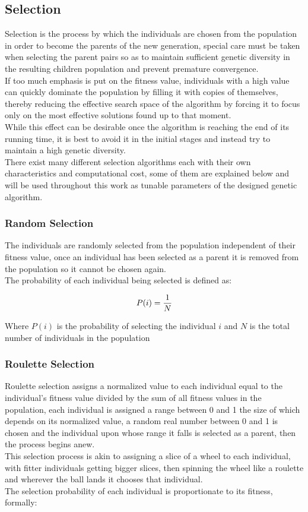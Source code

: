 \subsection{Selection}
Selection is the process by which the individuals are chosen from the population in order to become the parents of the new generation, special care must be taken when selecting the parent pairs so as to maintain sufficient genetic diversity in the resulting children population and prevent premature convergence.
\\If too much emphasis is put on the fitness value, individuals with a high value can quickly dominate the population by filling it with copies of themselves, thereby reducing the effective search space of the algorithm by forcing it to focus only on the most effective solutions found up to that moment.
\\While this effect can be desirable once the algorithm is reaching the end of its running time, it is best to avoid it in the initial stages and instead try to maintain a high genetic diversity.
\\There exist many different selection algorithms each with their own characteristics and computational cost, some of them are explained below and will be used throughout this work as tunable parameters of the designed genetic algorithm.

	\subsubsection{Random Selection}
	The individuals are randomly selected from the population independent of their fitness value, once an individual has been selected as a parent it is removed from the population so it cannot be chosen again. 
	\\The probability of each individual being selected is defined as:

	\begin{equation*}
	P(i) ={ 1 \over{N}}
	\end{equation*}

	Where $P(i)$ is the probability of selecting the individual $i$ and $N$ is the total number of individuals in the population

	\subsubsection{Roulette Selection}

	Roulette selection assigns a normalized value to each individual equal to the individual's fitness value divided by the sum of all fitness values in the population, each individual is assigned a range between 0 and 1 the size of which depends on its normalized value, a random real number between 0 and 1 is chosen and the individual upon whose range it falls is selected as a parent, then the process begins anew.
	\\This selection process is akin to assigning a slice of a wheel to each individual, with fitter individuals getting bigger slices, then spinning the wheel like a roulette and wherever the ball lands it chooses that individual.
	\\The selection probability of each individual is proportionate to its fitness, formally:

